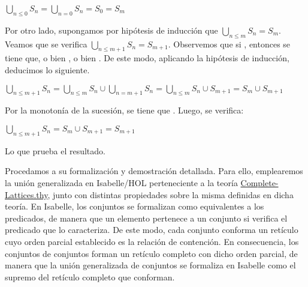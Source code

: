 \begin{isabellebody}
\begin{isamarkuptext}
\begin{demostracion}
  $\bigcup_{n \leq 0} S_{n} = \bigcup_{n = 0} S_{n} = S_{0} = S_{m}$

  Por otro lado, supongamos por hipótesis de inducción que $\bigcup_{n \leq m} S_{n} = S_{m}$.
  Veamos que se verifica $\bigcup_{n \leq m + 1} S_{n} = S_{m + 1}$. Observemos que si ,
  entonces se tiene que, o bien , o bien . De este modo, aplicando la 
  hipótesis de inducción, deducimos lo siguiente.

  $\bigcup_{n \leq m + 1} S_{n} = \bigcup_{n \leq m} S_{n} \cup \bigcup_{n = m + 1} S_{n} = \bigcup_{n \leq m} S_{n} \cup S_{m + 1} = S_{m} \cup S_{m + 1}$

  Por la monotonía de la sucesión, se tiene que . Luego, se verifica:

  $\bigcup_{n \leq m + 1} S_{n} = S_{m} \cup S_{m + 1} = S_{m + 1}$

  Lo que prueba el resultado.
\end{demostracion}

  Procedamos a su formalización y demostración detallada. Para ello, emplearemos la unión 
  generalizada en Isabelle/HOL perteneciente a la teoría 
  \href{https://n9.cl/gtf5x}{Complete-Lattices.thy}, junto con distintas propiedades sobre la misma
  definidas en dicha teoría. En Isabelle, los conjuntos se formalizan como equivalentes a los 
  predicados, de manera que un elemento pertenece a un conjunto si verifica el predicado que lo 
  caracteriza. De este modo, cada conjunto conforma un retículo cuyo orden parcial establecido es la 
  relación de contención. En consecuencia, los conjuntos de conjuntos forman un retículo completo 
  con dicho orden parcial, de manera que la unión generalizada de conjuntos se formaliza en Isabelle 
  como el supremo del retículo completo que conforman.



\end{isamarkuptext}
\end{isabellebody}
